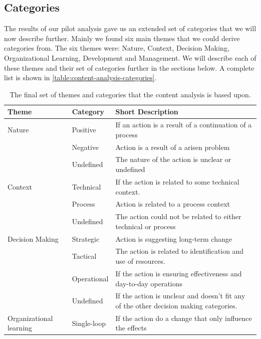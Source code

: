 \subsection{Categories}\label{method:categories}
The results of our pilot analysis gave us an extended set of categories that we will now describe further. Mainly we found six main themes that we could derive categories from. The six themes were: Nature, Context, Decision Making, Organizational Learning, Development and Management. We will describe each of these themes and their set of categories further in the sections below. A complete list is shown in \autoref{table:content-analysis-categories}. 

\begin{table}[h]
	\begin{center}
		\caption{The final set of themes and categories that the content analysis is based upon.}
		\label{table:content-analysis-categories}
		\begin{adjustbox}{width=\textwidth, totalheight=0.9\textheight, keepaspectratio}
			\begin{tabular}{| l | l | p{} |}
			\hline
			Theme & Category & Short Description  \\
			\hline
			Nature & Positive & If an action is a result of a continuation of a process \\ \cline{2-3}
			& Negative & Action is a result of a arisen problem \\ \cline{2-3}
			& Undefined & The nature of the action is unclear or undefined \\ \hline
			Context & Technical & If the action is related to some technical context. \\ \cline{2-3}
			& Process & Action is related to a process context \\ \cline{2-3}
			& Undefined & The action could not be related to either technical or process \\ 
			\hline
			Decision Making & Strategic & Action is suggesting long-term change \\ \cline{2-3}
			& Tactical & The action is related to identification and use of resources. \\ \cline{2-3}
			& Operational & If the action is ensuring effectiveness and day-to-day operations \\ \cline{2-3}
			& Undefined & If the action is unclear and doesn't fit any of the other decision making categories. \\ 
			\hline 
			Organizational learning & Single-loop & If the action do a change that only influence the effects \\ \cline{2-3}

\end{tabular}
\end{adjustbox}
\end{center}
\end{table}
